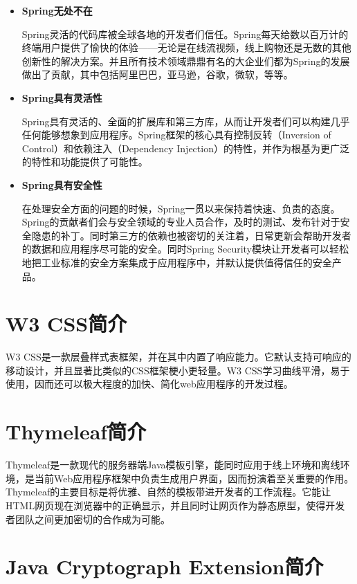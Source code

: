 \begin{itemize}
	\item \textbf{Spring无处不在}
	
	Spring灵活的代码库被全球各地的开发者们信任。Spring每天给数以百万计的终端用户提供了愉快的体验——无论是在线流视频，线上购物还是无数的其他创新性的解决方案。并且所有技术领域鼎鼎有名的大企业们都为Spring的发展做出了贡献，其中包括阿里巴巴，亚马逊，谷歌，微软，等等。
	
	\item \textbf{Spring具有灵活性}
	
	Spring具有灵活的、全面的扩展库和第三方库，从而让开发者们可以构建几乎任何能够想象到应用程序。Spring框架的核心具有控制反转（Inversion of Control）和依赖注入（Dependency Injection）的特性，并作为根基为更广泛的特性和功能提供了可能性。
	
	\item \textbf{Spring具有安全性}
	
	在处理安全方面的问题的时候，Spring一贯以来保持着快速、负责的态度。Spring的贡献者们会与安全领域的专业人员合作，及时的测试、发布针对于安全隐患的补丁。同时第三方的依赖也被密切的关注着，日常更新会帮助开发者的数据和应用程序尽可能的安全。同时Spring Security模块让开发者可以轻松地把工业标准的安全方案集成于应用程序中，并默认提供值得信任的安全产品。
	
\end{itemize}

\section{W3 CSS简介}

W3 CSS是一款层叠样式表框架，并在其中内置了响应能力。它默认支持可响应的移动设计，并且显著比类似的CSS框架梗小更轻量。W3 CSS学习曲线平滑，易于使用，因而还可以极大程度的加快、简化web应用程序的开发过程。

\section{Thymeleaf简介}

Thymeleaf是一款现代的服务器端Java模板引擎，能同时应用于线上环境和离线环境，是当前Web应用程序框架中负责生成用户界面，因而扮演着至关重要的作用。Thymeleaf的主要目标是将优雅、自然的模板带进开发者的工作流程。它能让HTML网页现在浏览器中的正确显示，并且同时让网页作为静态原型，使得开发者团队之间更加密切的合作成为可能。

\section{Java Cryptograph Extension简介}

